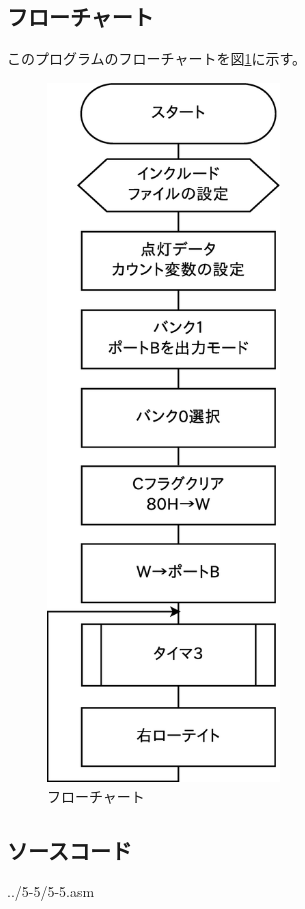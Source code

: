 \documentclass[a4paper,12pt]{ujarticle}
\begin{document}
  \subsection{フローチャート}
  このプログラムのフローチャートを図\ref{fig:flow_5-5}に示す。
  \begin{figure}[htbp]
   \begin{center}
     \includegraphics[height=185mm]{Diagram5-5.eps}
   \end{center}
   \caption{フローチャート}
   \label{fig:flow_5-5}
  \end{figure}
   \clearpage
  \subsection{ソースコード}
   \begin{lstinputlisting}[basicstyle=\ttfamily\footnotesize, frame=single,numbers=left]
    {../5-5/5-5.asm}
   \end{lstinputlisting}
   \clearpage
\end{document}
